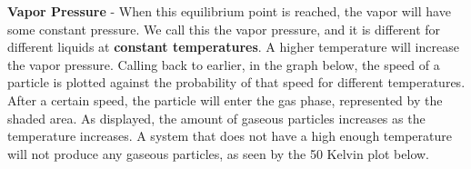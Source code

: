 \documentclass{article}
\begin{document}
\vspace{15pt}

\pagebreak


\noindent\textbf{Vapor Pressure} - When this equilibrium point is reached, the vapor will have some constant pressure. We call this the vapor pressure, and it is different for different liquids at \textbf{constant temperatures}. A higher temperature will increase the vapor pressure. Calling back to earlier, in the graph below, the speed of a particle is plotted against the probability of that speed for different temperatures. After a certain speed, the particle will enter the gas phase, represented by the shaded area. As displayed, the amount of gaseous particles increases as the temperature increases. A system that does not have a high enough temperature will not produce any gaseous particles, as seen by the 50 Kelvin plot below. 
\end{document}
